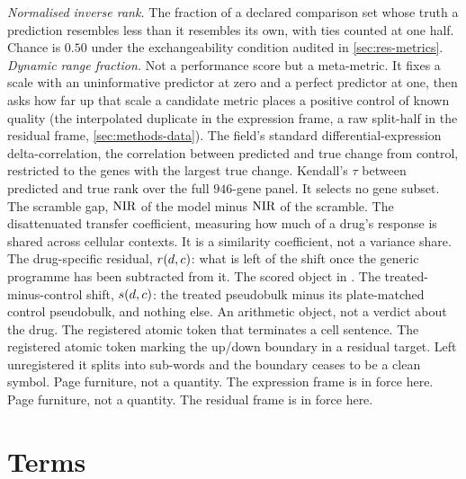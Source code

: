 \begin{description}[labelwidth=5em, leftmargin=6em, labelsep=0.6em,
                    style=multiline, font=\normalfont, itemsep=0.5ex]
 \emph{Normalised inverse rank.} The fraction of a declared
  comparison set whose truth a prediction resembles less than it resembles its
  own, with ties counted at one half. Chance is $0.50$ under the exchangeability
  condition audited in \cref{sec:res-metrics}.
 \emph{Dynamic range fraction.} Not a performance score but
  a meta-metric. It fixes a scale with an uninformative predictor at zero and a
  perfect predictor at one, then asks how far up that scale a candidate metric
  places a positive control of known quality (the interpolated duplicate in the
  expression frame, a raw split-half in the residual frame,
  \cref{sec:methods-data}).
 The field's standard differential-expres\-sion
  delta-cor\-re\-la\-tion, the correlation between predicted and true change
  from control, restricted to the genes with the largest true change.
 Kendall's $\tau$ between predicted and true rank
  over the full $946$-gene panel. It selects no gene subset.
 The scramble gap, $\textrm{NIR}$ of the model minus $\textrm{NIR}$ of the
  scramble.
 The disattenuated transfer coefficient, measuring how
  much of a drug's response is shared across cellular contexts. It is a
  similarity coefficient, not a variance share.
 The drug-specific residual, $r(d,c)$: what is
  left of the shift once the generic programme has been subtracted from it. The
  scored object in \Rframe.
 The treated-minus-control shift, $s(d,c)$: the
  treated pseudobulk minus its plate-matched control pseudobulk, and nothing
  else. An arithmetic object, not a verdict about the drug.
 The registered atomic token that terminates a cell
  sentence.
 The registered atomic token marking the up\slash down
  boundary in a residual target. Left unregistered it splits into sub-words and
  the boundary ceases to be a clean symbol.
 Page furniture, not a quantity. The expression frame
  is in force here.
 Page furniture, not a quantity. The residual frame is
  in force here.
\end{description}

\section*{Terms}

